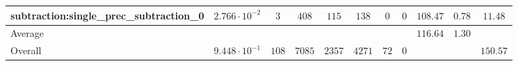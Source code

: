 \begin{tabular}{|l|c|c|c|c|c|c|c|c|c|c|}
subtraction:single\_prec\_subtraction\_0         & $ 2.766 \cdot 10^{-2} $ & $ 3      $ & $ 408  $ & $ 115  $ & $ 138   $ & $ 0  $ & $ 0 $ & $ 108.47      $ & $ 0.78    $ & $ 11.48   $ \\
\hline
Average                                          & $                     $ & $        $ & $      $ & $      $ & $       $ & $    $ & $   $ & $ 116.64      $ & $ 1.30    $ & $         $ \\
\hline
Overall                                          & $ 9.448 \cdot 10^{-1} $ & $ 108    $ & $ 7085 $ & $ 2357 $ & $ 4271  $ & $ 72 $ & $ 0 $ & $             $ & $         $ & $ 150.57  $ \\
\hline
\end{tabular}

